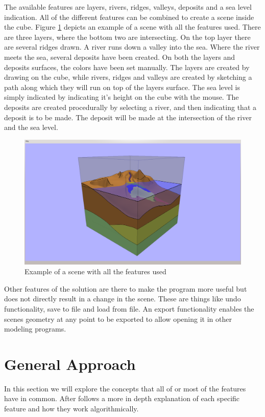 \documentclass[a4paper,12pt]{report}
\begin{document}
The available features are layers, rivers, ridges, valleys, deposits and a sea level indication. All of the different features can be combined to create a scene inside the cube. Figure \ref{fig:allFeatures} depicts an example of a scene with all the features used. There are three layers, where the bottom two are intersecting. On the top layer there are several ridges drawn. A river runs down a valley into the sea. Where the river meets the sea, several deposits have been created. On both the layers and deposits surfaces, the colors have been set manually. The layers are created by drawing on the cube, while rivers, ridges and valleys are created by sketching a path along which they will run on top of the layers surface. The sea level is simply indicated by indicating it's height on the cube with the mouse. The deposits are created procedurally by selecting a river, and then indicating that a deposit is to be made. The deposit will be made at the intersection of the river and the sea level.

\begin{figure}
 \includegraphics[trim = 50mm 5mm 50mm 7mm, clip,width=\linewidth]{thesis/results/allFeatures.png}
 \caption{Example of a scene with all the features used}
 \label{fig:allFeatures}
\end{figure}


Other features of the solution are there to make the program more useful but does not directly result in a change in the scene. These are things like undo functionality, save to file and load from file. An export functionality enables the scenes geometry at any point to be exported to allow opening it in other modeling programs.

\section{General Approach}
\label{subsec:generaldesign}
In this section we will explore the concepts that all of or most of the features have in common. After follows a more in depth explanation of each specific feature and how they work algorithmically.
\end{document}
